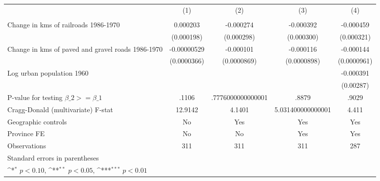 {
\def\sym#1{\ifmmode^{#1}\else\(^{#1}\)\fi}
\begin{tabular}{l*{4}{c}}
\hline\hline
                &\multicolumn{1}{c}{(1)}&\multicolumn{1}{c}{(2)}&\multicolumn{1}{c}{(3)}&\multicolumn{1}{c}{(4)}\\
                &\multicolumn{1}{c}{}&\multicolumn{1}{c}{}&\multicolumn{1}{c}{}&\multicolumn{1}{c}{}\\
\hline
Change in kms of railroads 1986-1970& 0.000203         &-0.000274         &-0.000392         &-0.000459         \\
                &(0.000198)         &(0.000298)         &(0.000300)         &(0.000321)         \\
[1em]
Change in kms of paved and gravel roads 1986-1970&-0.00000529         &-0.000101         &-0.000116         &-0.000144         \\
                &(0.0000366)         &(0.0000869)         &(0.0000898)         &(0.0000961)         \\
[1em]
Log urban population 1960&                  &                  &                  &-0.000391         \\
                &                  &                  &                  &(0.00287)         \\
\hline
P-value for testing $\beta\_{2} >= \beta\_{1}$&    .1106         &.7776000000000001         &    .8879         &    .9029         \\
Cragg-Donald (multivariate) F-stat&  12.9142         &   4.1401         &5.031400000000001         &    4.411         \\
Geographic controls&       No         &      Yes         &      Yes         &      Yes         \\
Province FE     &       No         &       No         &      Yes         &      Yes         \\
Observations    &      311         &      311         &      311         &      287         \\
\hline\hline
\multicolumn{5}{l}{\footnotesize Standard errors in parentheses}\\
\multicolumn{5}{l}{\footnotesize \sym{*} \(p<0.10\), \sym{**} \(p<0.05\), \sym{***} \(p<0.01\)}\\
\end{tabular}
}

